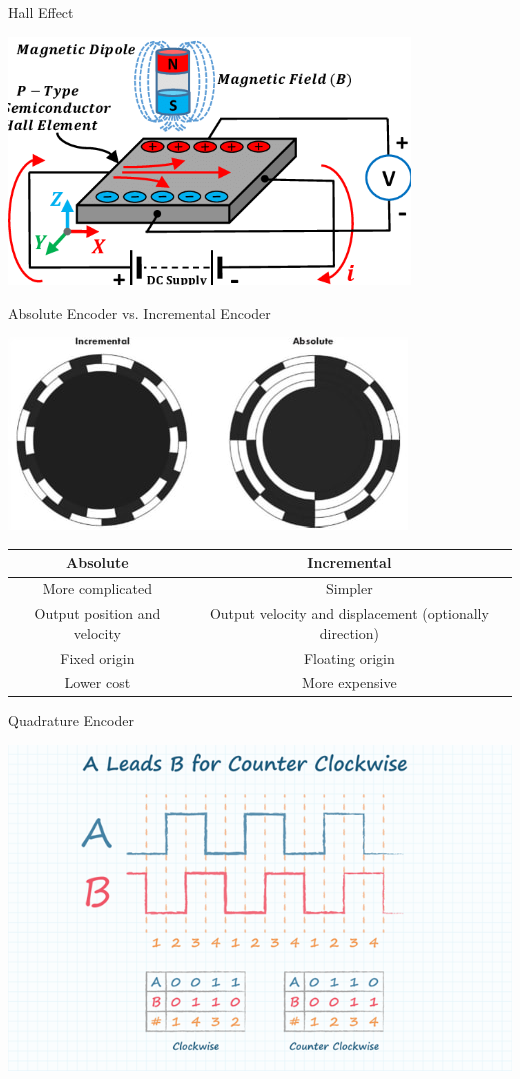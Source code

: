 \documentclass[12pt,letterpaper]{beamer}
\begin{document}
\begin{frame}{Hall Effect}

\centering
\includegraphics[width=0.8\textwidth]{hall_effect}

\end{frame}

\begin{frame}{Absolute Encoder vs. Incremental Encoder}

    \centering
    \includegraphics[width=0.6\linewidth]{absolute_incremental}

    {\scriptsize
    \begin{tabular}{ cc }
        \hline
        \textbf{Absolute} & \textbf{Incremental} \\
        \hline
        More complicated & Simpler \\
        Output position and velocity & Output velocity and displacement (optionally direction) \\
        Fixed origin & Floating origin \\
        Lower cost & More expensive \\
        \hline
    \end{tabular}
}
    
\end{frame}

\begin{frame}{Quadrature Encoder}
    
    \centering
    \includegraphics[width=0.8\linewidth]{quadrature}

\end{frame}
\end{document}
